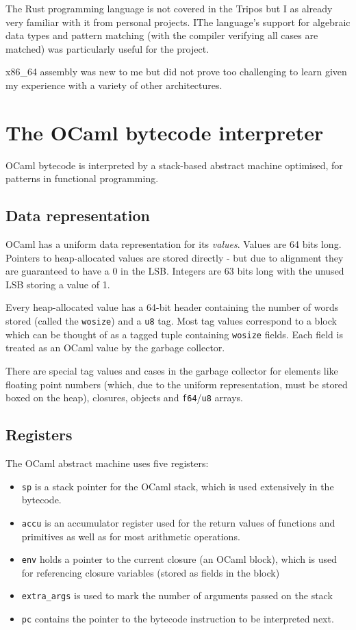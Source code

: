 The Rust programming language is not covered in the Tripos but I as already very familiar with
it from personal projects. IThe language's support for algebraic data types and pattern matching
(with the compiler verifying all cases are matched) was particularly useful for the project.

x86\_64 assembly was new to me but did not prove too challenging to learn given my experience with
a variety of other architectures.

\section{The OCaml bytecode interpreter}

OCaml bytecode is interpreted by a stack-based abstract machine optimised, for patterns in
functional programming.

\subsection{Data representation}

OCaml has a uniform data representation for its \emph{values}. Values are 64 bits long.
Pointers to heap-allocated values are stored directly - but due to alignment they are guaranteed to
have a 0 in
the LSB. Integers are 63 bits long with the unused LSB storing a value of 1.

Every heap-allocated value has a 64-bit header containing the number of words stored (called
the \texttt{wosize}) and a \texttt{u8} tag. Most tag values correspond to a block which can be
thought of as a tagged tuple containing \texttt{wosize} fields. Each field is treated as an OCaml
value by the garbage collector.

There are special tag values and cases in the garbage collector for elements like floating point
numbers (which, due to the uniform representation, must be stored boxed on the heap),
closures, objects and \texttt{f64}/\texttt{u8} arrays.

\subsection{Registers}

The OCaml abstract machine uses five registers:

\begin{itemize}
    \item \texttt{sp} is a stack pointer for the OCaml stack, which is used extensively
          in the bytecode.
    \item \texttt{accu} is an accumulator register used for the return values of functions
          and primitives as well as for most arithmetic operations.
    \item \texttt{env} holds a pointer to the current closure (an OCaml block), which is used for
          referencing closure variables (stored as fields in the block)
    \item \texttt{extra\_args} is used to mark the number of arguments passed on the stack
    \item \texttt{pc} contains the pointer to the bytecode instruction to be interpreted next.
\end{itemize}

